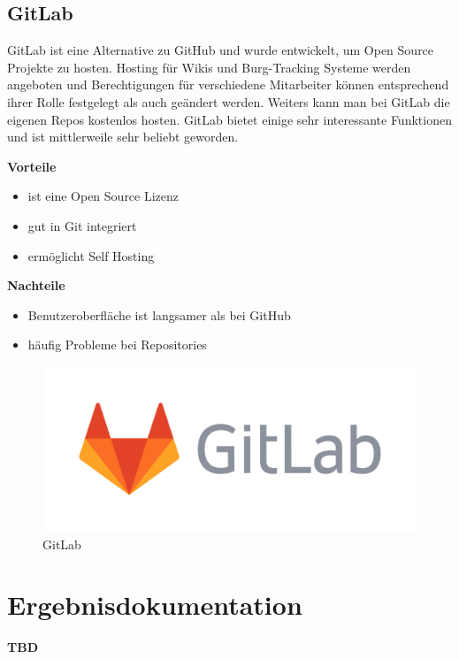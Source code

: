 \section{GitLab}
GitLab ist eine Alternative zu GitHub und wurde entwickelt, um Open Source Projekte zu hosten. Hosting für Wikis und Burg-Tracking Systeme werden angeboten und Berechtigungen für verschiedene Mitarbeiter können entsprechend ihrer Rolle festgelegt als auch geändert werden. Weiters kann man bei GitLab die eigenen Repos kostenlos hosten. GitLab bietet einige sehr interessante Funktionen und ist mittlerweile sehr beliebt geworden.   \textcite{GitHubVsGitLab}

 \textbf{Vorteile}
  \begin{itemize}
  	\item ist eine Open Source Lizenz
  	\item gut in Git integriert
  	\item ermöglicht Self Hosting
  \end{itemize}
  
  \textbf{Nachteile}
  \begin{itemize}
  	\item Benutzeroberfläche ist langsamer als bei GitHub
  	\item häufig Probleme bei Repositories 
  \end{itemize}
  
  
  \begin{figure}[H]
  	\centering
  	\includegraphics[width=0.5\linewidth]{images/GitLab.png}
  	\caption[GitLab]{GitLab}
  	\label{fig:GitLab}
  \end{figure}
  


\chapter{Ergebnisdokumentation}
\textbf{TBD}


